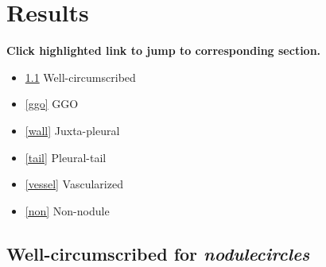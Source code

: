 \documentclass[onecolumn]{IEEEtran}
\begin{document}
\section{Results}
\textbf{Click highlighted link to jump to corresponding section.}
\begin{itemize}
\item \ref{iso} Well-circumscribed
\item \ref{ggo} GGO
\item \ref{wall} Juxta-pleural
\item \ref{tail} Pleural-tail
\item \ref{vessel} Vascularized
\item \ref{non} Non-nodule
\end{itemize}

\newpage
\subsection{Well-circumscribed for \emph{nodulecircles}}
\label{iso}
\begin{figure}[H]
 \centering
{}
\hspace{.1in}
\end{figure}
\end{document}
